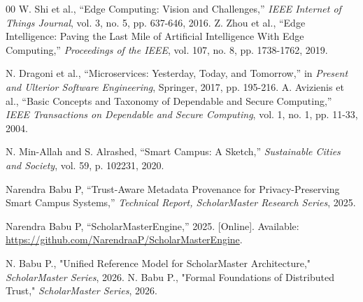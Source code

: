 \documentclass[conference]{IEEEtran}
\begin{document}
\begin{thebibliography}{00}
 W. Shi et al., ``Edge Computing: Vision and Challenges,'' \textit{IEEE Internet of Things Journal}, vol. 3, no. 5, pp. 637-646, 2016.
 Z. Zhou et al., ``Edge Intelligence: Paving the Last Mile of Artificial Intelligence With Edge Computing,'' \textit{Proceedings of the IEEE}, vol. 107, no. 8, pp. 1738-1762, 2019.

 N. Dragoni et al., ``Microservices: Yesterday, Today, and Tomorrow,'' in \textit{Present and Ulterior Software Engineering}, Springer, 2017, pp. 195-216.
 A. Avizienis et al., ``Basic Concepts and Taxonomy of Dependable and Secure Computing,'' \textit{IEEE Transactions on Dependable and Secure Computing}, vol. 1, no. 1, pp. 11-33, 2004.

 N. Min-Allah and S. Alrashed, ``Smart Campus: A Sketch,'' \textit{Sustainable Cities and Society}, vol. 59, p. 102231, 2020.

 Narendra Babu P, ``Trust-Aware Metadata Provenance for Privacy-Preserving Smart Campus Systems,'' \textit{Technical Report, ScholarMaster Research Series}, 2025.

 Narendra Babu P, ``ScholarMasterEngine,'' 2025. [Online]. Available: \url{https://github.com/NarendraaP/ScholarMasterEngine}.


 N. Babu P., "Unified Reference Model for ScholarMaster Architecture," \textit{ScholarMaster Series}, 2026.
 N. Babu P., "Formal Foundations of Distributed Trust," \textit{ScholarMaster Series}, 2026.
\end{thebibliography}
\end{document}

